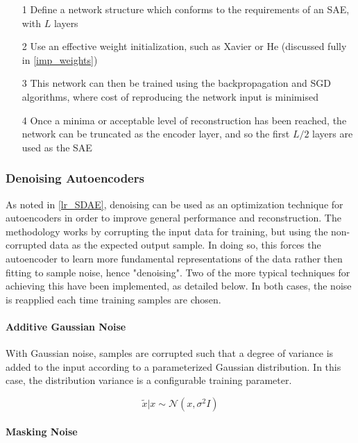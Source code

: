 \documentclass[a4paper,11pt,oneside]{article}
\theoremstyle{plain}
\theoremstyle{definition}
\begin{document}
\begin{itemize}
	\item [1] Define a network structure which conforms to the requirements of an SAE, with $L$ layers
	\item [2] Use an effective weight initialization, such as Xavier or He (discussed fully in \ref{imp_weights})
	\item [3] This network can then be trained using the backpropagation and SGD algorithms, where cost of reproducing the network input is minimised
	\item [4] Once a minima or acceptable level of reconstruction has been reached, the network can be truncated as the encoder layer, and so the first $L/2$ layers are used as the SAE
\end{itemize}

\subsubsection{Denoising Autoencoders}

As noted in \ref{lr_SDAE}, denoising can be used as an optimization technique for autoencoders in order to improve general performance and reconstruction. The methodology works by corrupting the input data for training, but using the non-corrupted data as the expected output sample. In doing so, this forces the autoencoder to learn more fundamental representations of the data rather then fitting to sample noise, hence "denoising". Two of the more typical techniques for achieving this have been implemented, as detailed below. In both cases, the noise is reapplied each time training samples are chosen.

\paragraph{Additive Gaussian Noise}

With Gaussian noise, samples are corrupted such that a degree of variance is added to the input according to a parameterized Gaussian distribution. In this case, the distribution variance is a configurable training parameter.

\begin{equation}
\tilde{{x}} | {x} \sim \mathcal{N}\left({x}, \sigma^{2} I\right)
\end{equation}

\paragraph{Masking Noise}
\end{document}
